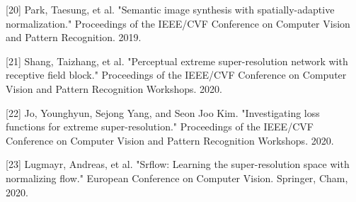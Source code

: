 \documentclass{article}
\begin{document}
[20] Park, Taesung, et al. "Semantic image synthesis with spatially-adaptive normalization." Proceedings of the IEEE/CVF Conference on Computer Vision and Pattern Recognition. 2019.

[21] Shang, Taizhang, et al. "Perceptual extreme super-resolution network with receptive field block." Proceedings of the IEEE/CVF Conference on Computer Vision and Pattern Recognition Workshops. 2020.

[22] Jo, Younghyun, Sejong Yang, and Seon Joo Kim. "Investigating loss functions for extreme super-resolution." Proceedings of the IEEE/CVF Conference on Computer Vision and Pattern Recognition Workshops. 2020.

[23] Lugmayr, Andreas, et al. "Srflow: Learning the super-resolution space with normalizing flow." European Conference on Computer Vision. Springer, Cham, 2020.
\end{document}
